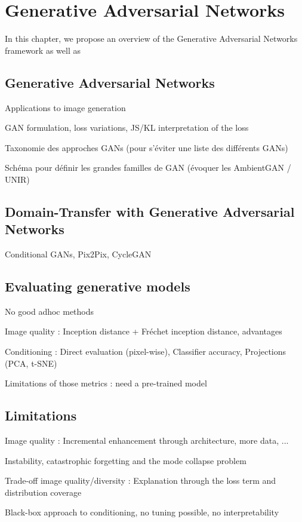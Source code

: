 \chapter{Generative Adversarial Networks}
\label{chap:chapter1}

\begin{chapterabstract}
	In this chapter, we propose an overview	 of the Generative Adversarial Networks \cite{Goodfellow2014} framework as well as 
\end{chapterabstract}

\section{Generative Adversarial Networks}
Applications to image generation

GAN formulation, loss variations, JS/KL interpretation of the loss

Taxonomie des approches GANs (pour s'éviter une liste des différents GANs)

Schéma pour définir les grandes familles de GAN (évoquer les AmbientGAN / UNIR)


\section{Domain-Transfer with Generative Adversarial Networks}

Conditional GANs, Pix2Pix, CycleGAN

\section{Evaluating generative models}

No good adhoc methods

Image quality : Inception distance + Fréchet inception distance, advantages

Conditioning : Direct evaluation (pixel-wise), Classifier accuracy, Projections (PCA, t-SNE)

Limitations of those metrics : need a pre-trained model

\section{Limitations}
Image quality : Incremental enhancement through architecture, more data, ... 

Instability, catastrophic forgetting and the mode collapse problem

Trade-off image quality/diversity : Explanation through the loss term and distribution coverage

Black-box approach to conditioning, no tuning possible, no interpretability
